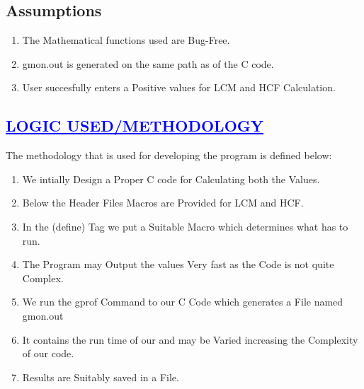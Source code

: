 \documentclass[a4paper,12pt]{report}
\begin{document}
\section*{Assumptions}

\begin{enumerate}
\item The Mathematical functions used are Bug-Free.
\item gmon.out is generated on the same path as of the C code.
\item User succesfully enters a Positive values for LCM and HCF Calculation.

\end{enumerate}
 
\begin{center}
\chapter{\textcolor{blue}{\underline {LOGIC USED/METHODOLOGY}}}
\end{center}
The methodology that is used for developing the program is defined below:\\

\begin{enumerate}
\item We intially Design a Proper C code for Calculating both the Values.
\item Below the Header Files Macros are Provided for LCM and HCF.
\item In the (define) Tag we put a Suitable Macro which determines what has to run.
\item The Program may Output the values Very fast as the Code is not quite Complex.
\item We run the gprof Command to our C Code which generates a File named gmon.out
\item It contains  the run time of our and may be Varied increasing the Complexity of our code.
\item Results are Suitably saved in a File.
\end{enumerate}
\end{document}

